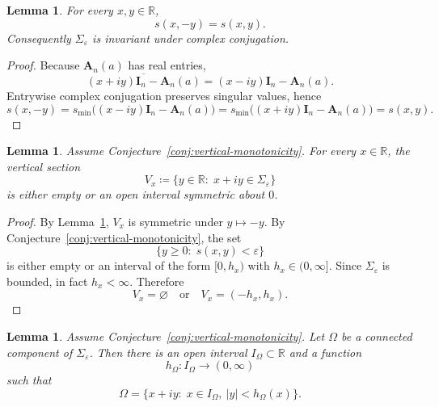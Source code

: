 \documentclass[11pt]{article}
\newtheorem{lemma}[theorem]{Lemma}
\begin{document}
\begin{lemma}\label{lem:conjugation-symmetry}
For every \(x,y\in\mathbb R\),
\[
s(x,-y)=s(x,y).
\]
Consequently \(\Sigma_\varepsilon\) is invariant under complex conjugation.
\end{lemma}

\begin{proof}
Because \(\mathbf A_n(a)\) has real entries,
\[
\overline{(x+iy)\mathbf I_n-\mathbf A_n(a)}
=
(x-iy)\mathbf I_n-\mathbf A_n(a).
\]
Entrywise complex conjugation preserves singular values, hence
\[
s(x,-y)
=
s_{\min}\!\bigl((x-iy)\mathbf I_n-\mathbf A_n(a)\bigr)
=
s_{\min}\!\bigl((x+iy)\mathbf I_n-\mathbf A_n(a)\bigr)
=
s(x,y).
\]
\end{proof}

\begin{lemma}\label{lem:vertical-sections}
Assume Conjecture~\ref{conj:vertical-monotonicity}.  For every \(x\in\mathbb R\), the vertical section
\[
V_x
\coloneqq
\{y\in\mathbb R:\; x+iy\in\Sigma_\varepsilon\}
\]
is either empty or an open interval symmetric about \(0\).
\end{lemma}

\begin{proof}
By Lemma~\ref{lem:conjugation-symmetry}, \(V_x\) is symmetric under \(y\mapsto -y\).
By Conjecture~\ref{conj:vertical-monotonicity}, the set
\[
\{y\ge 0:\; s(x,y)<\varepsilon\}
\]
is either empty or an interval of the form \([0,h_x)\) with \(h_x\in(0,\infty]\).
Since \(\Sigma_\varepsilon\) is bounded, in fact \(h_x<\infty\). Therefore
\[
V_x=\varnothing
\quad\text{or}\quad
V_x=(-h_x,h_x).
\]
\end{proof}

\begin{lemma}\label{lem:component-fibers}
Assume Conjecture~\ref{conj:vertical-monotonicity}.  Let \(\Omega\) be a connected component of \(\Sigma_\varepsilon\). Then there is an
open interval \(I_\Omega\subset\mathbb R\) and a function
\[
h_\Omega:I_\Omega\to(0,\infty)
\]
such that
\[
\Omega
=
\{x+iy:\; x\in I_\Omega,\ |y|<h_\Omega(x)\}.
\]
\end{lemma}
\end{document}
